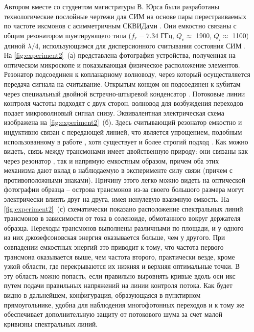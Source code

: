 \documentclass[14pt, a4paper]{extreport}
\numberwithin{equation}{section}
\begin{document}
Автором вместе со студентом магистратуры В. Юрса были разработаны технологические послойные чертежи для СИМ на основе пары перестраиваемых по частоте иксмонов с асимметричным СКВИДами \cite{hutchings2017tunable}. Они емкостно связаны с общим резонатором шунтирующего типа \cite{probst2015efficient} ($f_r = 7.34$ ГГц, $Q_e\approx$ 1900, $Q_l\approx$ 1100) длиной $\lambda/4$, использующимся для дисперсионного считывания состояния СИМ \cite{chow2010detecting}. На \autoref{fig:experiment2}~(а) представлена фотография устройства, полученная на оптическом микроскопе и показывающая физическое расположение элементов. Резонатор подсоединен к копланарному волноводу, через который осуществляется передача сигнала на считывание. Открытым концом он подсоединен к кубитам через специальный двойной встречно-штыревой конденсатор \cite{barends2013coherent}. Потоковые линии контроля частоты подходят с двух сторон, волновод для возбуждения переходов подает микроволновый сигнал снизу. Эквивалентная электрическая схема изображена на \autoref{fig:experiment2}~(б). Здесь считывающий резонатор емкостно и индуктивно связан с передающей линией, что является упрощением, подобным использованному в работе \cite{khalil2012}, хотя существует и более строгий подход \cite{besedin2018quality}. Как можно видеть, связь между трансмонами имеет двойственную природу: они связаны как через резонатор \cite{majer2007coupling, filipp2009two}, так и напрямую емкостным образом, причем оба этих механизма дают вклад в наблюдаемую в эксперименте силу связи (причем с противоположными знаками). Причину этого легко можно видеть на оптической фотографии образца -- острова трансмонов из-за своего большого размера могут электрически влиять друг на друга, имея ненулевую взаимную емкость. На \autoref{fig:experiment2}~(с) схематически показано расположение спектральных линий трансмонов в зависимости от тока в соленоиде, обмотанного вокруг держателя образца. Переходы трансмонов выполнены различными по площади, и у одного из них джозефсоновская энергия оказывается больше, чем у другого. При совпадении емкостных энергий это приводит к тому, что частота первого трансмона оказывается выше, чем частота второго, практически везде, кроме узкой области, где перекрываются их нижняя и верхняя оптимальные точки. В эту область можно попасть, если правильно выровнять кривые вдоль оси икс путем подачи правильных напряжений на линии контроля потока. Как будет видно в дальнейшем, конфигурация, образующаяся в пунктирном прямоугольнике, удобна для наблюдения многофотонных переходов и к тому же обеспечивает дополнительную защиту от потокового шума за счет малой кривизны спектральных линий.
\end{document}
